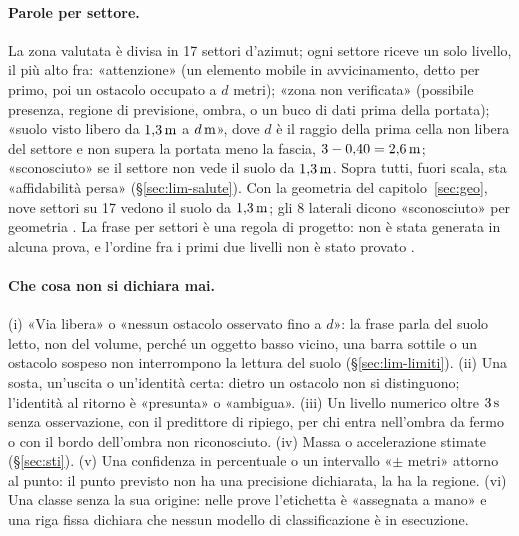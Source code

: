 \paragraph{Parole per settore.} La zona valutata è divisa in 17 settori d'azimut; ogni settore riceve un solo livello, il più alto fra: «attenzione» (un elemento mobile in avvicinamento, detto per primo, poi un ostacolo occupato a $d$ metri); «zona non verificata» (possibile presenza, regione di previsione, ombra, o un buco di dati prima della portata); «suolo visto libero da $1{,}3\,\mathrm{m}$ a $d\,\mathrm{m}$», dove $d$ è il raggio della prima cella non libera del settore e non supera la portata meno la fascia, $3-0{,}40=2{,}6\,\mathrm{m}$; «sconosciuto» se il settore non vede il suolo da $1{,}3\,\mathrm{m}$. Sopra tutti, fuori scala, sta «affidabilità persa» (\S\ref{sec:lim-salute}). Con la geometria del capitolo~\ref{sec:geo}, nove settori su 17 vedono il suolo da $1{,}3\,\mathrm{m}$; gli 8 laterali dicono «sconosciuto» per geometria . La frase per settori è una regola di progetto: non è stata generata in alcuna prova, e l'ordine fra i primi due livelli non è stato provato .

\paragraph{Che cosa non si dichiara mai.} (i) «Via libera» o «nessun ostacolo osservato fino a $d$»: la frase parla del suolo letto, non del volume, perché un oggetto basso vicino, una barra sottile o un ostacolo sospeso non interrompono la lettura del suolo (\S\ref{sec:lim-limiti}). (ii) Una sosta, un'uscita o un'identità certa: dietro un ostacolo non si distinguono; l'identità al ritorno è «presunta» o «ambigua». (iii) Un livello numerico oltre $3\,\mathrm{s}$ senza osservazione, con il predittore di ripiego, per chi entra nell'ombra da fermo o con il bordo dell'ombra non riconosciuto. (iv) Massa o accelerazione stimate (\S\ref{sec:sti}). (v) Una confidenza in percentuale o un intervallo «$\pm$ metri» attorno al punto: il punto previsto non ha una precisione dichiarata, la ha la regione. (vi) Una classe senza la sua origine: nelle prove l'etichetta è «assegnata a mano» e una riga fissa dichiara che nessun modello di classificazione è in esecuzione.

